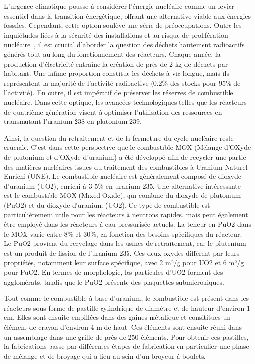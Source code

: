L'urgence climatique pousse à considérer l'énergie nucléaire comme un levier essentiel dans la transition énergétique, offrant une alternative viable aux énergies fossiles. Cependant, cette option soulève une série de préoccupations. Outre les inquiétudes liées à la sécurité des installations et au risque de prolifération nucléaire~\cite{npt_resolution}, il est crucial d'aborder la question des déchets hautement radioactifs générés tout au long du fonctionnement des réacteurs. Chaque année, la production d'électricité entraîne la création de près de 2 kg de déchets par habitant. Une infime proportion constitue les déchets à vie longue, mais ils représentent la majorité de l'activité radioactive (0.2\% des stocks pour 95\% de l'activité). En outre, il est impératif de préserver les réserves de combustible nucléaire. Dans cette optique, les avancées technologiques telles que les réacteurs de quatrième génération visent à optimiser l'utilisation des ressources en transmutant l'uranium 238 en plutonium 239.

Ainsi, la question du retraitement et de la fermeture du cycle nucléaire reste cruciale. C'est dans cette perspective que le combustible MOX (Mélange d’OXyde de plutonium et d’OXyde d’uranium) a été développé afin de recycler une partie des matières nucléaires issues du traitement des combustibles à Uranium Naturel Enrichi (UNE).
Le combustible nucléaire est généralement composé de dioxyde d'uranium (UO2), enrichi à 3-5\% en uranium 235. Une alternative intéressante est le combustible MOX (Mixed Oxide), qui combine du dioxyde de plutonium (PuO2) et du dioxyde d'uranium (UO2). Ce type de combustible est particulièrement utile pour les réacteurs à neutrons rapides, mais peut également être employé dans les réacteurs à eau pressurisée actuels. La teneur en PuO2 dans le MOX varie entre 8\% et 30\%, en fonction des besoins spécifiques du réacteur. Le PuO2 provient du recyclage dans les usines de retraitement, car le plutonium est un produit de fission de l'uranium 235. Ces deux oxydes diffèrent par leurs propriétés, notamment leur surface spécifique, avec 2 m²/g pour UO2 et 6 m²/g pour PuO2. En termes de morphologie, les particules d'UO2 forment des agglomérats, tandis que le PuO2 présente des plaquettes submicroniques.

Tout comme le combustible à base d'uranium, le combustible est présent dans les réacteurs sous forme de pastille cylindrique de diamètre et de hauteur d'environ 1 cm. Elles sont ensuite empillées dans des gaines métalique et consititues un élément de crayon d'environ 4 m de haut. Ces éléments sont ensuite réuni dans un assemblage dans une grille de près de 250 éléments. Pour obtenir ces pastilles, la fabrications passe par différentes étapes de fabrication en particulier une phase de mélange et de broyage qui a lieu au sein d'un broyeur à boulets.

